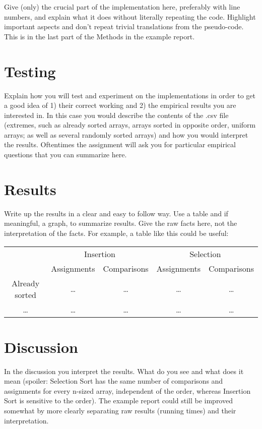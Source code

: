 \documentclass[a4paper,10pt,oneside]{article}
\begin{document}
Give (only) the crucial part of the implementation here, preferably with line numbers, and
explain what it does without literally repeating the code. Highlight important aspects and
don’t repeat trivial translations from the pseudo-code. This is in the last part of the Methods
in the example report.

\section{Testing}

Explain how you will test and experiment on the implementations in order to get a good
idea of 1) their correct working and 2) the empirical results you are interested in. In this
case you would describe the contents of the .csv file (extremes, such as already sorted arrays,
arrays sorted in opposite order, uniform arrays; as well as several randomly sorted arrays) and
how you would interpret the results. Oftentimes the assignment will ask you for particular
empirical questions that you can summarize here.

\section{Results}

Write up the results in a clear and easy to follow way. Use a table and if meaningful, a
graph, to summarize results. Give the raw facts here, not the interpretation of the facts. For
example, a table like this could be useful:\\
\begin{tabular}{c|c|c|c|c}
	& \multicolumn{2}{c|}{Insertion} & \multicolumn{2}{c}{Selection} \\
	& Assignments & Comparisons & Assignments & Comparisons \\
	\hline
	Already sorted & \ldots & \ldots & \ldots & \ldots \\
	\ldots & \ldots & \ldots & \ldots & \ldots \\
	\end{tabular}

\section{Discussion}

In the discussion you interpret the results. What do you see and what does it mean (spoiler:
Selection Sort has the same number of comparisons and assignments for every n-sized array,
independent of the order, whereas Insertion Sort is sensitive to the order). The example report
could still be improved somewhat by more clearly separating raw results (running times) and
their interpretation.
\end{document}
